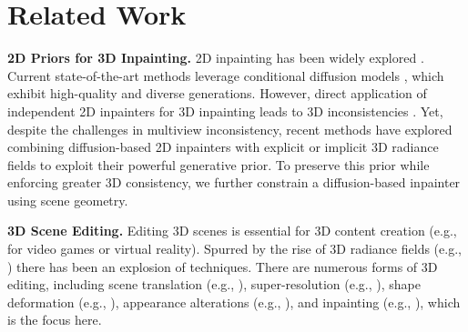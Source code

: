 \section{Related Work}
\label{sec:related-work}

\noindent\textbf{2D Priors for 3D Inpainting.}
2D inpainting has been widely explored \cite{quan2024inpaintingsurvey}. Current state-of-the-art methods leverage conditional diffusion models \cite{stable.diffusion,zhang2023controlnet,ju2024brushnet}, which exhibit high-quality and diverse generations. However,
direct application of independent 2D inpainters for 3D inpainting
leads to 3D inconsistencies \cite{spinnerf,reference.guided.nerf}. 
Yet, despite the challenges in multiview inconsistency, recent methods \cite{weber2024nerfiller,prabhu2023inpaint3d,mirzaei2024reffusion,chen2024mvip,lin2025taming} have explored combining diffusion-based 2D inpainters with explicit or implicit 3D radiance fields to exploit their powerful generative prior.
To preserve this prior while enforcing greater 3D consistency, we further constrain a diffusion-based inpainter using scene geometry.


\noindent\textbf{3D Scene Editing.} Editing 3D %
scenes is essential for 3D content creation (e.g., for video games or virtual reality).
Spurred by the rise of
3D radiance fields
(e.g., \cite{rabby2023beyondpixels,chen2024survey}) there has been an explosion of techniques.
There are numerous forms of 3D editing, including 
scene translation 
(e.g., \cite{in2n,wys,vicanerf,koo2024posterior,chen2024dge,chen2024gaussianeditor,wu2024gaussctrl,wang2025view}),
super-resolution 
(e.g., \cite{huang2023refsr,lee2024disr}),
shape deformation 
(e.g., \cite{yuan2022nerf,zheng2023editablenerf,jambon2023nerfshop}),
appearance alterations
(e.g., \cite{mazzucchelli2024irene,kuang2023palettenerf,wang2023seal,lee2023ice}),
and
inpainting
(e.g., \cite{spinnerf,weder2023removing,nerf.in,reference.guided.nerf}),
which is the focus here.

